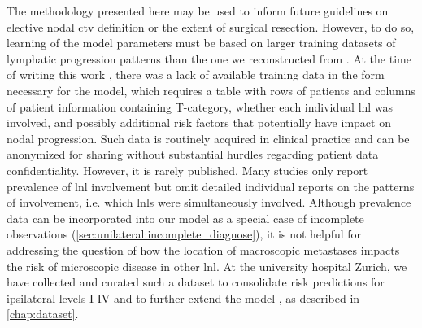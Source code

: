 \documentclass[\relativeRoot/main.tex]{subfiles}
\begin{document}
The methodology presented here may be used to inform future guidelines on elective nodal \gls{ctv} definition or the extent of surgical resection. However, to do so, learning of the model parameters must be based on larger training datasets of lymphatic progression patterns than the one we reconstructed from \cite{sanguineti_defining_2009}. At the time of writing this work \cite{ludwig_hidden_2021}, there was a lack of available training data in the form necessary for the model, which requires a table with rows of patients and columns of patient information containing T-category, whether each individual \gls{lnl} was involved, and possibly additional risk factors that potentially have impact on nodal progression. Such data is routinely acquired in clinical practice and can be anonymized for sharing without substantial hurdles regarding patient data confidentiality. However, it is rarely published. Many studies only report prevalence of \gls{lnl} involvement \cite{lindberg_distribution_1972,woolgar_histological_1999,candela_patterns_1990,vauterin_patterns_2006,ho_patterns_2012,shah_patterns_1990,razfar_incidence_2009,woolgar_topography_2007,chung_pattern_2016} but omit detailed individual reports on the patterns of involvement, i.e. which \glspl{lnl} were simultaneously involved. Although prevalence data can be incorporated into our model as a special case of incomplete observations (\cref{sec:unilateral:incomplete_diagnose}), it is not helpful for addressing the question of how the location of macroscopic metastases impacts the risk of microscopic disease in other \gls{lnl}. At the university hospital Zurich, we have collected and curated such a dataset to consolidate risk predictions for ipsilateral levels I-IV and to further extend the model \cite{ludwig_detailed_2021,ludwig_dataset_2021}, as described in \cref{chap:dataset}.
\end{document}
